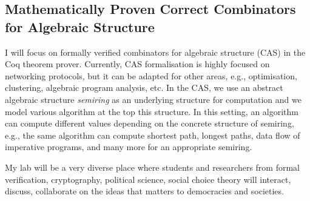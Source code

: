\documentclass[a4paper]{article}
\begin{document}
\subsection{Mathematically Proven Correct Combinators for Algebraic Structure}
I will focus on formally verified combinators for algebraic structure (CAS) in the Coq theorem prover. 
Currently, CAS formalisation is highly focused on networking protocols, but it can be 
adapted for other areas, e.g., optimisation, clustering, algebraic program 
analysis, etc. In the CAS, we use an abstract algebraic structure 
\emph{semiring} as an underlying structure
for computation and we model various algorithm at the top this 
structure. In this setting, an algorithm can compute different values depending 
on the concrete structure of semiring, e.g., the same algorithm 
can compute shortest path, longest paths, 
data flow of imperative programs, and many more \cite{gondran2008graphs} 
for an appropriate semiring.



My lab will be a very diverse place where students and researchers from formal 
verification, cryptography, 
political science, social choice theory will interact, discuss, 
collaborate on the ideas that matters to democracies and societies.


 

\end{document}
